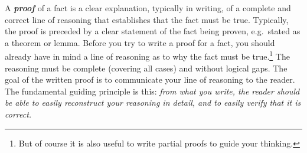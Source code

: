 A \textbf{\emph{proof}} of a fact is a clear explanation, typically in writing,
of a complete and correct line of reasoning that establishes that the fact must be true.
Typically, the proof is preceded by a clear statement of the fact being proven,
e.g.~stated as a theorem or lemma.
%
Before you try to write a proof for a fact,
you should already have in mind a line of reasoning as to why the fact must be true.\footnote
{But of course it is also useful
to write partial proofs to guide your thinking.}
The reasoning must be complete (covering all cases) and without logical gaps.
The goal of the written proof is to communicate your line of reasoning to the reader.
The fundamental guiding principle is this:
\emph{from what you write,
  the reader should be able to easily reconstruct your reasoning in detail,
  and to easily verify that it is correct.}


